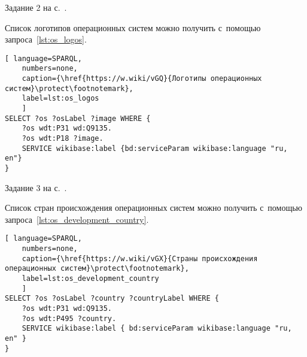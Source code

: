 \begin{task}
\label{answer:os_and_logos}
    \AnswerBackref Задание 2 на с.~\pageref{tasks:operating_system_tasks}.

    Список логотипов операционных систем можно получить с~помощью запроса~\ref{lst:os_logos}.

\begin{lstlisting}[ language=SPARQL, 
    numbers=none,
    caption={\href{https://w.wiki/vGQ}{Логотипы операционных систем}\protect\footnotemark},
    label=lst:os_logos
	]
SELECT ?os ?osLabel ?image WHERE {
    ?os wdt:P31 wd:Q9135.
    ?os wdt:P18 ?image.
    SERVICE wikibase:label {bd:serviceParam wikibase:language "ru, en"}
}\end{lstlisting}
\end{task}


\begin{task}
\label{answer:os_country}
    \AnswerBackref Задание 3 на с.~\pageref{tasks:operating_system_tasks}.

    Список стран происхождения операционных систем можно получить с~помощью запроса~\ref{lst:os_development_country}.

\begin{lstlisting}[ language=SPARQL, 
    numbers=none,
    caption={\href{https://w.wiki/vGX}{Страны происхождения операционных систем}\protect\footnotemark},
	label=lst:os_development_country
	]
SELECT ?os ?osLabel ?country ?countryLabel WHERE {
	?os wdt:P31 wd:Q9135.
	?os wdt:P495 ?country.
	SERVICE wikibase:label { bd:serviceParam wikibase:language "ru, en" }
}\end{lstlisting}
\end{task}




